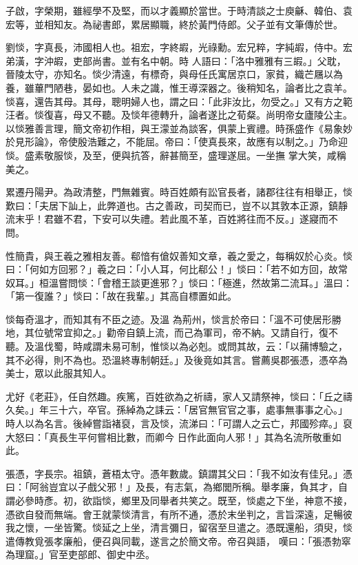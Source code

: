 \begin{pinyinscope}
 子啟，字榮期，雖經學不及堅，而以才義顯於當世。于時清談之士庾龢、韓伯、袁宏等，並相知友。為祕書郎，累居顯職，終於黃門侍郎。父子並有文筆傳於世。



 劉惔，字真長，沛國相人也。祖宏，字終嘏，光祿勳。宏兄粹，字純嘏，侍中。宏弟潢，字沖嘏，吏部尚書。並有名中朝。時
 人語曰：「洛中雅雅有三嘏。」父耽，晉陵太守，亦知名。惔少清遠，有標奇，與母任氏寓居京口，家貧，織芒屩以為養，雖蓽門陋巷，晏如也。人未之識，惟王導深器之。後稍知名，論者比之袁羊。惔喜，還告其母。其母，聰明婦人也，謂之曰：「此非汝比，勿受之。」又有方之範汪者。惔復喜，母又不聽。及惔年德轉升，論者遂比之荀粲。尚明帝女廬陵公主。以惔雅善言理，簡文帝初作相，與王濛並為談客，俱蒙上賓禮。時孫盛作《易象妙於見形論》，帝使殷浩難之，不能屈。帝曰：「使真長來，故應有以制之。」乃命迎惔。盛素敬服惔，及至，便與抗答，辭甚簡至，盛理遂屈。一坐撫
 掌大笑，咸稱美之。



 累遷丹陽尹。為政清整，門無雜賓。時百姓頗有訟官長者，諸郡往往有相舉正，惔歎曰：「夫居下訕上，此弊道也。古之善政，司契而已，豈不以其敦本正源，鎮靜流末乎！君雖不君，下安可以失禮。若此風不革，百姓將往而不反。」遂寢而不問。



 性簡貴，與王羲之雅相友善。郗愔有傖奴善知文章，羲之愛之，每稱奴於心炎。惔曰：「何如方回邪？」羲之曰：「小人耳，何比郗公！」惔曰：「若不如方回，故常奴耳。」桓溫嘗問惔：「會稽王談更進邪？」惔曰：「極進，然故第二流耳。」溫曰：「第一復誰？」惔曰：「故在我輩。」其高自標置如此。



 惔每奇溫才，而知其有不臣之迹。及溫
 為荊州，惔言於帝曰：「溫不可使居形勝地，其位號常宜抑之。」勸帝自鎮上流，而己為軍司，帝不納。又請自行，復不聽。及溫伐蜀，時咸謂未易可制，惟惔以為必剋。或問其故，云：「以蒱博驗之，其不必得，則不為也。恐溫終專制朝廷。」及後竟如其言。嘗薦吳郡張憑，憑卒為美士，眾以此服其知人。



 尤好《老莊》，任自然趣。疾篤，百姓欲為之祈禱，家人又請祭神，惔曰：「丘之禱久矣。」年三十六，卒官。孫綽為之誄云：「居官無官官之事，處事無事事之心。」時人以為名言。後綽嘗詣褚裒，言及惔，流涕曰：「可謂人之云亡，邦國殄瘁。」裒大怒曰：「真長生平何嘗相比數，而卿今
 日作此面向人邪！」其為名流所敬重如此。



 張憑，字長宗。祖鎮，蒼梧太守。憑年數歲。鎮謂其父曰：「我不如汝有佳兒。」憑曰：「阿翁豈宜以子戲父邪！」及長，有志氣，為鄉閭所稱。舉孝廉，負其才，自謂必參時彥。初，欲詣惔，鄉里及同舉者共笑之。既至，惔處之下坐，神意不接，憑欲自發而無端。會王就蒙惔清言，有所不通，憑於末坐判之，言旨深遠，足暢彼我之懷，一坐皆驚。惔延之上坐，清言彌日，留宿至旦遣之。憑既還船，須臾，惔遣傳教覓張孝廉船，便召與同載，遂言之於簡文帝。帝召與語，
 嘆曰：「張憑勃窣為理窟。」官至吏部郎、御史中丞。




\end{pinyinscope}
